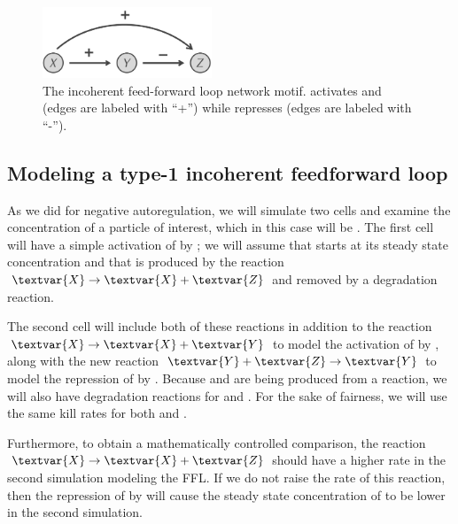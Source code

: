 \begin{figure}[h]
\centering
\mySfFamily
\includegraphics[width = 0.45\textwidth]{../images/type-1_incoherent_feed-forward_loop.png}
\caption{The incoherent feed-forward loop network motif.  activates  and  (edges are labeled with ``+'') while  represses  (edges are labeled with ``-'').}
\label{fig:type-1_incoherent_feed-forward_loop}
\end{figure}

\begin{qbox}\end{qbox}

\FloatBarrier
{}
\subsection{Modeling a type-1 incoherent feedforward loop}

As we did for negative autoregulation, we will simulate two cells and examine the concentration of a particle of interest, which in this case will be . The first cell will have a simple activation of  by ; we will assume that  starts at its steady state concentration and that  is produced by the reaction $\textvar{X} \rightarrow \textvar{X} + \textvar{Z}$ and removed by a degradation reaction.

The second cell will include both of these reactions in addition to the reaction $\textvar{X} \rightarrow \textvar{X} + \textvar{Y}$ to model the activation of  by , along with the new reaction $\textvar{Y} + \textvar{Z} \rightarrow \textvar{Y}$ to model the repression of  by . Because  and  are being produced from a reaction, we will also have degradation reactions for  and . For the sake of fairness, we will use the same kill rates for both  and .

Furthermore, to obtain a mathematically controlled comparison, the reaction $\textvar{X} \rightarrow \textvar{X} + \textvar{Z}$ should have a higher rate in the second simulation modeling the FFL. If we do not raise the rate of this reaction, then the repression of  by  will cause the steady state concentration of  to be lower in the second simulation.

